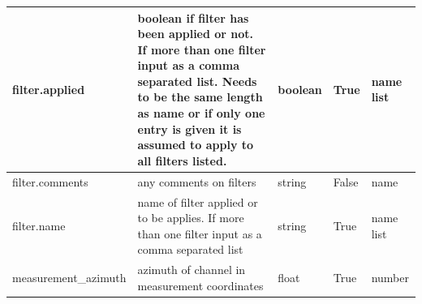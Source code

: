 \documentclass{article}
\begin{document}
\begin{table}[h!]
\begin{tabular}{|l|p{2.75in}|l|l|p{.95in}|}
	filter.applied & boolean if filter has been applied or not. If more than one filter input as a comma separated list.  Needs to be the same length as name or if only one entry is given it is assumed to apply to all filters listed. & boolean & True & name list \\ \hline
	filter.comments & any comments on filters & string & False & name \\ \hline
	filter.name & name of filter applied or to be applies. If more than one filter input as a comma separated list & string & True & name list \\ \hline
	measurement\_azimuth & azimuth of channel in measurement coordinates & float & True & number \\ \hline
    
    \end{tabular}
    \label{tab:electric01}
\end{table}    
\end{document}
